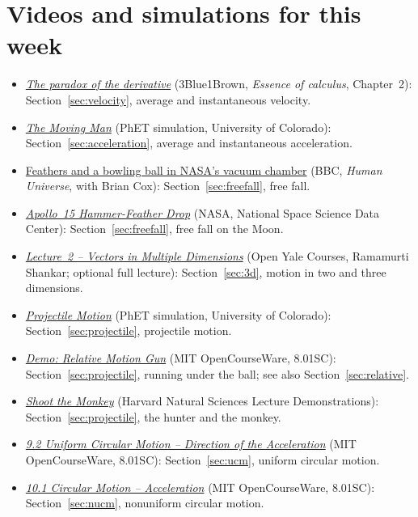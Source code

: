 \documentclass[11pt,a4paper]{article}
\begin{document}
\section*{Videos and simulations for this week}
\begin{itemize}[nosep]
\item \href{https://www.youtube.com/watch?v=9vKqVkMQHKk}{\emph{The paradox of the derivative}}
  (3Blue1Brown, \emph{Essence of calculus}, Chapter~2): Section~\ref{sec:velocity}, average and
  instantaneous velocity.
\item \href{https://phet.colorado.edu/en/simulations/moving-man}{\emph{The Moving Man}} (PhET
  simulation, University of Colorado): Section~\ref{sec:acceleration}, average and instantaneous
  acceleration.
\item \href{https://www.youtube.com/watch?v=E43-CfukEgs}{Feathers and a bowling ball in NASA's
  vacuum chamber} (BBC, \emph{Human Universe}, with Brian Cox): Section~\ref{sec:freefall}, free
  fall.
\item \href{https://nssdc.gsfc.nasa.gov/planetary/lunar/apollo_15_feather_drop.html}{\emph{Apollo~15
  Hammer-Feather Drop}} (NASA, National Space Science Data Center): Section~\ref{sec:freefall},
  free fall on the Moon.
\item \href{https://oyc.yale.edu/physics/phys-200/lecture-2}{\emph{Lecture~2 -- Vectors in Multiple
  Dimensions}} (Open Yale Courses, Ramamurti Shankar; optional full lecture): Section~\ref{sec:3d},
  motion in two and three dimensions.
\item \href{https://phet.colorado.edu/en/simulations/projectile-motion}{\emph{Projectile Motion}}
  (PhET simulation, University of Colorado): Section~\ref{sec:projectile}, projectile motion.
\item \href{https://ocw.mit.edu/courses/8-01sc-classical-mechanics-fall-2016/resources/demo-relative-motion-gun/}{\emph{Demo:
  Relative Motion Gun}} (MIT OpenCourseWare, 8.01SC): Section~\ref{sec:projectile}, running under
  the ball; see also Section~\ref{sec:relative}.
\item \href{https://www.youtube.com/watch?v=0jGZnMf3rPo}{\emph{Shoot the Monkey}} (Harvard Natural
  Sciences Lecture Demonstrations): Section~\ref{sec:projectile}, the hunter and the monkey.
\item \href{https://www.ocw.mit.edu/courses/8-01sc-classical-mechanics-fall-2016/resources/9-1}{\emph{9.2
  Uniform Circular Motion -- Direction of the Acceleration}} (MIT OpenCourseWare, 8.01SC):
  Section~\ref{sec:ucm}, uniform circular motion.
\item \href{https://ocw.mit.edu/courses/8-01sc-classical-mechanics-fall-2016/resources/10}{\emph{10.1
  Circular Motion -- Acceleration}} (MIT OpenCourseWare, 8.01SC): Section~\ref{sec:nucm},
  nonuniform circular motion.
\end{itemize}
\end{document}
